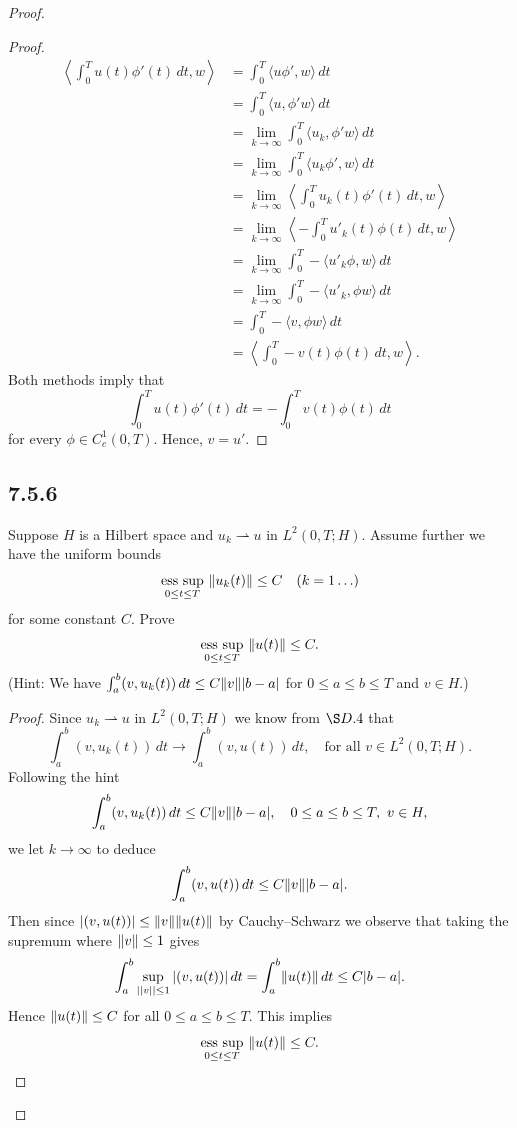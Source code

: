 \documentclass{article}
\DeclarePairedDelimiter{\norm}{\lVert}{\rVert}
\begin{document}
\begin{flushleft}
\begin{proof}
\begin{proof}
\begin{align*}
\left\langle \int_0^T u(t)\phi'(t)\,dt,w \right\rangle &= 
\int_0^T \langle u\phi',w\rangle \,dt \\&=
\int_0^T \langle u,\phi' w\rangle \,dt \\&=
\lim_{k\to\infty} \int_0^T \langle u_k,\phi'w\rangle \,dt \\&=
\lim_{k\to\infty} \int_0^T \langle u_k\phi',w\rangle \,dt \\&=
\lim_{k\to\infty} \left\langle \int_0^T u_k(t)\phi'(t)\,dt,w\right\rangle \\&=
\lim_{k\to\infty} \left\langle -\int_0^T u'_k(t)\phi(t)\,dt,w\right\rangle\\&=
\lim_{k\to\infty} \int_0^T - \langle u'_k \phi,w\rangle \,dt\\&=
\lim_{k\to\infty} \int_0^T -\langle u'_k,\phi w\rangle \,dt\\&=
\int_0^T -\langle v,\phi w\rangle \,dt \\&=
\left\langle \int_0^T - v(t)\phi(t)\,dt, w\right\rangle.
\end{align*}
Both methods imply that
$$\int_0^T u(t)\phi'(t) \, dt = -\int_0^T v(t)\phi(t) \, dt$$ 
for every $\phi \in C_c^1(0,T)$. Hence, $v=u'$.
\end{proof}
\subsection{\textbf{7.5.6}} Suppose $H$ is a Hilbert space and $u_k \rightharpoonup u$ in $L^2(0,T;H)$. Assume further we have the uniform bounds
$$\operatorname*{ess~sup}_{0\leq t\leq T}~\norm{u_k(t)}\le C \quad (k=1\ldots)$$
for some constant $C$. Prove 
$$\operatorname*{ess~sup}_{0\leq t\leq T}~\norm{u(t)}\le C.$$
(Hint: We have $\int_a^b(v,u_k(t))\,dt\le C\norm{v}|b-a|$ for $0\le a\le b \le T$ and $v\in H.$)
\begin{proof} Since $u_k \rightharpoonup u$ in $L^2(0,T;H)$ we know from $\S D.4$ that
$$\int_a^b(v,u_k(t))\,dt \to \int_a^b(v,u(t))\,dt, \quad \text{for all $v\in L^2(0,T;H).$}$$
Following the hint
$$\int_a^b(v,u_k(t))\,dt\le C\norm{v}|b-a|,\quad 0\le a\le b \le T,~ v\in H,$$
we let $k\to \infty$ to deduce
$$\int_a^b(v,u(t))\,dt\le C\norm{v}|b-a|.$$
Then since $|(v,u(t))|\le \norm{v}\norm{u(t)}$ by Cauchy–Schwarz we observe that taking the supremum where $\norm{v}\le 1$ gives
$$ \int_a^b\sup_{||v||\leq 1}|(v,u(t))|\,dt=\int_a^b \norm{u(t)}\,dt \le C|b-a|.$$
Hence $\norm{u(t)}\le C$ for all $0\le a\le b \le T$. This implies
$$\operatorname*{ess~sup}_{0\leq t\leq T}~\norm{u(t)}\le C.$$
\end{proof}

\end{proof}
\end{flushleft}
\end{document}

